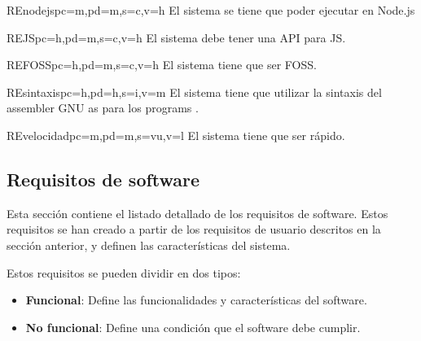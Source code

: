 \begin{userReq}{RE}{nodejs}{pc=m,pd=m,s=c,v=h}
    El sistema se tiene que poder ejecutar en Node.js
\end{userReq}

\begin{userReq}{RE}{JS}{pc=h,pd=m,s=c,v=h}
    El sistema debe tener una \gls{API} para \gls{JS}.
\end{userReq}

\begin{userReq}{RE}{FOSS}{pc=h,pd=m,s=c,v=h}
    El sistema tiene que ser \gls{FOSS}.
\end{userReq}

\begin{userReq}{RE}{sintaxis}{pc=h,pd=h,s=i,v=m}
    El sistema tiene que utilizar la sintaxis del \gls{assembler} GNU as para
    los \glspl{program} .
\end{userReq}

\begin{userReq}{RE}{velocidad}{pc=m,pd=m,s=vu,v=l}
    El sistema tiene que ser rápido. %
\end{userReq}

\FloatBarrier


\subsection{Requisitos de software}\label{subsec:software-requirements}

Esta sección contiene el listado detallado de los requisitos de software. Estos
requisitos se han creado a partir de los requisitos de usuario descritos en la
sección anterior, y definen las características del sistema.

\noindent
Estos requisitos se pueden dividir en dos tipos:

\begin{itemize}
    \item \textbf{Funcional}: Define las funcionalidades y características del
    software.
    \item \textbf{No funcional}: Define una condición que el software debe cumplir.
\end{itemize}

